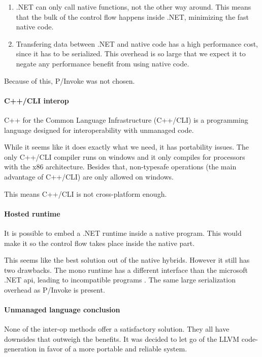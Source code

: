 \begin{enumerate}
    \item .NET can only call native functions, not the other way around.
        This means that the bulk of the control flow happens inside .NET, minimizing the fast native code.
    \item Transfering data between .NET and native code has a high performance cost\cite{msdn_interop_performance}, since it has to be serialized.
        This overhead is so large that we expect it to negate any performance benefit from using native code.
\end{enumerate}

Because of this, P/Invoke was not chosen.

\paragraph{C++/CLI interop}
C++ for the Common Language Infrastructure (C++/CLI) is a programming language designed for interoperability with unmanaged code.\cite{msdn_c++cli}

While it seems like it does exactly what we need, it has portability issues.
The only C++/CLI compiler runs on windows and it only compiles for processors with the x86 architecture\cite{mono_c++cli}.
Besides that, non-typesafe operations (the main advantage of C++/CLI) are only allowed on windows.\cite{mono_c++cli}

This means C++/CLI is not cross-platform enough.

\paragraph{Hosted runtime}
It is possible to embed a .NET runtime inside a native program.
This would make it so the control flow takes place inside the native part.

This seems like the best solution out of the native hybrids.
However it still has two drawbacks.
The mono runtime has a different interface than the microsoft .NET api, leading to incompatible programs \cite{mono_embedding}.
The same large serialization overhead as P/Invoke is present\cite{msdn_hosted}.

\paragraph{Unmanaged language conclusion}
None of the inter-op methods offer a satisfactory solution.
They all have downsides that outweigh the benefits.
It was decided to let go of the LLVM code-generation in favor of a more portable and reliable system.

